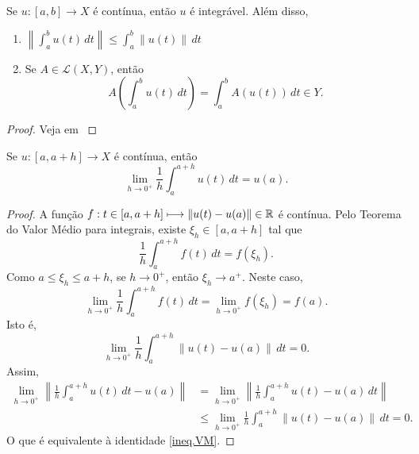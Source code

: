 \begin{proposition}\label{KthA3.2}
Se $u:[a,b]\longrightarrow X$ é {contínua}, então $u$ é integrável. Além disso, 
\begin{enumerate}
    \item $\displaystyle\left\|\int_a^b u(t)\,dt\right\|\leq \int_a^b \|u(t)\|\,dt$
    \item Se $A\in \mathcal{L}(X,Y)$, então
    \[ A\left(\int_a^b u(t)\,dt\right)=\int_a^b A(u(t))\,dt\in Y. \]
\end{enumerate}
\end{proposition}
\begin{proof}
Veja em \cite[Theorem A3.2]{kesavan2015topics}
\end{proof}

\begin{proposition}\label{Prop.VM}
Se $u:[a,a+h]\longrightarrow X$ é {contínua}, então
\begin{equation}\label{ineq.VM}
\lim\limits_{h\to 0^+} \frac{1}{h}\int_a^{a+h} u(t)\,dt = u(a).
\end{equation}
\end{proposition}
\begin{proof}
A função  $f:t\in [a,a+h]\longmapsto \|u(t)-u(a)\|\in \mathbb{R}$ é contínua. Pelo Teorema do Valor Médio para integrais, existe $\xi_h\in [a,a+h]$ tal que 
\[
\frac{1}{h}\int_a^{a+h} f(t)\,dt=f(\xi_h).
\]
Como $a\leq \xi_h\leq a+h$, se $h\to 0^+$, então $\xi_h\to a^+$. Neste caso, 
\[
\lim_{h\to 0^+}\frac{1}{h}\int_a^{a+h} f(t)\,dt=\lim_{h\to 0^+}f(\xi_h)=f(a).
\]
Isto é, 
\begin{equation*}
\lim_{h\to 0^+}\frac{1}{h}\int_a^{a+h} \|u(t)-u(a)\|\,dt=0.
\end{equation*}
Assim, 
\begin{align*}
\lim_{h\to 0^+}\left\|\frac{1}{h}\int_a^{a+h} u(t)\,dt -u(a)\right\|& =
\lim_{h\to 0^+}\left\|\frac{1}{h}\int_a^{a+h} u(t)-u(a)\,dt\right\|\\
&\leq \lim_{h\to 0^+}\frac{1}{h}\int_a^{a+h}\left\| u(t)-u(a)\right\|\,dt
=0.
\end{align*}
O que é equivalente à identidade \eqref{ineq.VM}.
\end{proof}